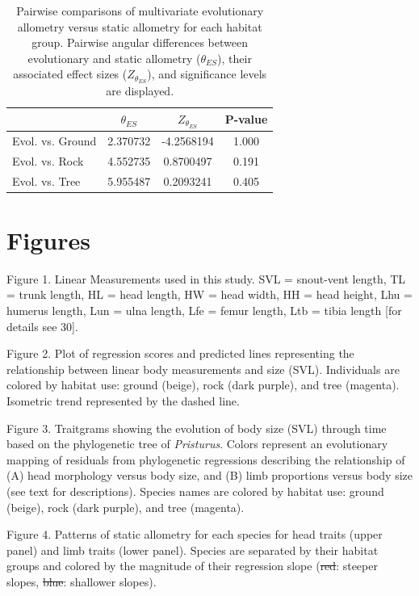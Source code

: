 \documentclass[
  11pt,
]{article}
\providecommand{\DIFaddtex}[1]{{\protect\color{blue}\uwave{#1}}} %
\providecommand{\DIFdeltex}[1]{{\protect\color{red}\sout{#1}}}                      %
\providecommand{\DIFaddbegin}{} %
\providecommand{\DIFaddend}{} %
\providecommand{\DIFdelbegin}{} %
\providecommand{\DIFdelend}{} %
\providecommand{\DIFadd}[1]{\texorpdfstring{\DIFaddtex{#1}}{#1}} %
\providecommand{\DIFdel}[1]{\texorpdfstring{\DIFdeltex{#1}}{}} %
\newcommand{\DIFscaledelfig}{0.5}
\newlength{\DIFdelgraphicswidth} %
\newlength{\DIFdelgraphicsheight} %
\newcommand{\DIFaddincludegraphics}[2][]{{\color{blue}\fbox{\DIFOincludegraphics[#1]{#2}}}} %
\newcommand{\DIFdelincludegraphics}[2][]{%
\sbox{\DIFdelgraphicsbox}{\DIFOincludegraphics[#1]{#2}}%
\settoboxwidth{\DIFdelgraphicswidth}{\DIFdelgraphicsbox} %
\settoboxtotalheight{\DIFdelgraphicsheight}{\DIFdelgraphicsbox} %
\scalebox{\DIFscaledelfig}{%
\parbox[b]{\DIFdelgraphicswidth}{\usebox{\DIFdelgraphicsbox}\\[-\baselineskip] \rule{\DIFdelgraphicswidth}{0em}}\llap{\resizebox{\DIFdelgraphicswidth}{\DIFdelgraphicsheight}{%
\setlength{\unitlength}{\DIFdelgraphicswidth}%
\begin{picture}(1,1)%
\thicklines\linethickness{2pt} %
{\color[rgb]{1,0,0}\put(0,0){\framebox(1,1){}}}%
{\color[rgb]{1,0,0}\put(0,0){\line( 1,1){1}}}%
{\color[rgb]{1,0,0}\put(0,1){\line(1,-1){1}}}%
\end{picture}%
}\hspace*{3pt}}} %
} %
\DeclareRobustCommand{\DIFaddbegin}{\DIFOaddbegin \let\includegraphics\DIFaddincludegraphics} %
\DeclareRobustCommand{\DIFaddend}{\DIFOaddend \let\includegraphics\DIFOincludegraphics} %
\DeclareRobustCommand{\DIFdelbegin}{\DIFOdelbegin \let\includegraphics\DIFdelincludegraphics} %
\DeclareRobustCommand{\DIFdelend}{\DIFOaddend \let\includegraphics\DIFOincludegraphics} %
\begin{document}
\begin{table}[H]

\caption{\label{tab:unnamed-chunk-3}Pairwise comparisons of multivariate evolutionary allometry versus static allometry for each habitat group. Pairwise angular differences between evolutionary and static allometry ($\theta_{ES}$), their associated effect sizes ($Z_{\theta_{ES}}$), and significance levels are displayed.}
\centering
\begin{tabular}[t]{lccc}
\toprule
  & $\theta_{ES}$ & $Z_{\theta_{ES}}$ & P-value\\
\midrule
Evol. vs. Ground & 2.370732 & -4.2568194 & 1.000\\
Evol. vs. Rock & 4.552735 & 0.8700497 & 0.191\\
Evol. vs. Tree & 5.955487 & 0.2093241 & 0.405\\
\bottomrule
\end{tabular}
\end{table}

\newpage

\hypertarget{figures}{%
\section{Figures}\label{figures}}

Figure 1. Linear Measurements used in this study. SVL = snout-vent
length, TL = trunk length, HL = head length, HW = head width, HH = head
height, Lhu = humerus length, Lun = ulna length, Lfe = femur length, Ltb
= tibia length {[}for details see 30{]}.

Figure 2. Plot of regression scores and predicted lines representing the
relationship between linear body measurements and size (SVL).
Individuals are colored by habitat use: ground (beige), rock (dark
purple), and tree (magenta). Isometric trend represented by the dashed
line.

Figure 3. Traitgrams showing the evolution of body size (SVL) through
time based on the phylogenetic tree of \emph{Pristurus}. Colors
represent an evolutionary mapping of residuals from phylogenetic
regressions describing the relationship of (A) head morphology versus
body size, and (B) limb proportions versus body size (see text for
descriptions). Species names are colored by habitat use: ground (beige),
rock (dark purple), and tree (magenta).

Figure 4. Patterns of static allometry for each species for head traits
(upper panel) and limb traits (lower panel). Species are separated by
their habitat groups and colored by the magnitude of their regression
slope (\DIFdelbegin \DIFdel{red}\DIFdelend \DIFaddbegin \DIFadd{purple}\DIFaddend : steeper slopes, \DIFdelbegin \DIFdel{blue}\DIFdelend \DIFaddbegin \DIFadd{yellow}\DIFaddend : shallower slopes).
\end{document}
